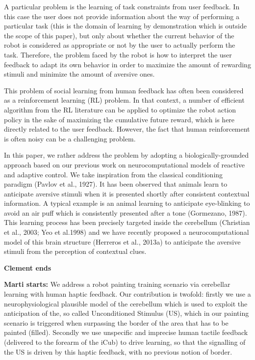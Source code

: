 \documentclass[letterpaper, 10 pt, conference]{ieeeconf}  %
\begin{document}
A particular problem is the learning of task constraints from user feedback. In this case the user does not provide information about the way of performing a particular task (this is the domain of learning by demonstration which is outside the scope of this paper), but only about whether the current behavior of the robot is considered as appropriate or not by the user to actually perform the task. Therefore, the problem faced by the robot is how to interpret the user feedback to adapt its own behavior in order to maximize the amount of rewarding stimuli and minimize the amount of aversive ones.

This problem of social learning from human feedback has often been considered as a reinforcement learning (RL) problem. In that context, a number of efficient algorithm from the RL literature can be applied to optimize the robot action policy in the sake of maximizing the cumulative future reward, which is here directly related to the user feedback. However, the fact that human reinforcement is often noisy can be a challenging problem.

In this paper, we rather address the problem by adopting a biologically-grounded approach based on our previous work on neurocomputational models of reactive and adaptive control. We take inspiration from the classical conditioning paradigm (Pavlov et al., 1927). It has been observed that animals learn to anticipate aversive stimuli when it is presented shortly after consistent contextual information. A typical example is an animal learning to anticipate eye-blinking to avoid an air puff which is consistently presented after a tone (Gormezano, 1987). This learning process has been precisely targeted inside the cerebellum (Christian et al., 2003; Yeo et al.1998) and we have recently proposed a neurocomputational model of this brain structure (Herreros et al., 2013a) to anticipate the aversive stimuli from the perception of contextual clues. 

\textbf{Clement ends}

\textbf{Marti starts:}
We address a robot painting training scenario via cerebellar learning with human haptic feedback. Our contribution is twofold: firstly we use a neurophysiological plausible model of the  cerebellum  \cite{herreros2013nucleo} which is used to exploit the anticipation of the, so called Unconditioned Stimulus (US), which in our painting scenario is triggered when surpassing the border of the area that has to be painted (filled). Secondly we use unspecific and imprecise human tactile feedback (delivered to the forearm of the iCub) to drive learning, so that the signalling of the US is driven by this haptic feedback, with no previous notion of border.
\end{document}
